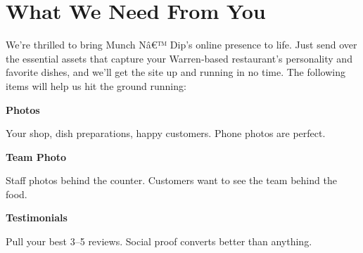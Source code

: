 \documentclass[11pt,letterpaper]{article}
\begin{document}
\vspace{0.2em}

\section*{What We Need From You}

We’re thrilled to bring Munch Nâ€™ Dip’s online presence to life. Just send over the essential assets that capture your Warren‑based restaurant’s personality and favorite dishes, and we’ll get the site up and running in no time. The following items will help us hit the ground running:

\vspace{0.12em}

\noindent\begin{minipage}[t]{0.48\textwidth}
\begin{tcolorbox}[colframe=accent-teal, boxrule=1pt, left=0.7em, right=0.7em, top=0.5em, bottom=0.5em, arc=4pt, boxsep=0pt]
{\bfseries\small\color{accent-teal}Photos}

\vspace{0.15em}

{\small Your shop, dish preparations, happy customers. Phone photos are perfect.}
\end{tcolorbox}

\vspace{0.1em}

\begin{tcolorbox}[colframe=accent-teal, boxrule=1pt, left=0.7em, right=0.7em, top=0.5em, bottom=0.5em, arc=4pt, boxsep=0pt]
{\bfseries\small\color{accent-teal}Team Photo}

\vspace{0.15em}

{\small Staff photos behind the counter. Customers want to see the team behind the food.}
\end{tcolorbox}

\vspace{0.1em}

\begin{tcolorbox}[colframe=accent-teal, boxrule=1pt, left=0.7em, right=0.7em, top=0.5em, bottom=0.5em, arc=4pt, boxsep=0pt]
{\bfseries\small\color{accent-teal}Testimonials}

\vspace{0.15em}

{\small Pull your best 3--5 reviews. Social proof converts better than anything.}
\end{tcolorbox}
\end{minipage}
\end{document}

